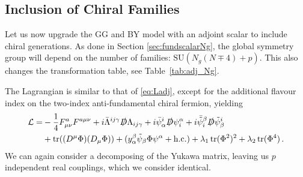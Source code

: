 \subsection{Inclusion of Chiral Families}\label{sec:adjNg}
 Let us now upgrade the GG and BY model with an adjoint scalar to include chiral generations. As done in Section \ref{sec:fundscalarNg}, the global symmetry group will depend on the number of families: $\mathrm{SU}(N_g(N\mp4)+p)$. This also changes the transformation table, see Table~\ref{tab:adj_Ng}. 

The Lagrangian is similar to that of \eqref{eq:Ladj}, except for the additional flavour index on the two-index anti-fundamental chiral fermion, yielding
\begin{align}
   \mathcal{L}= &-\frac{1}{4} F_{\mu\nu}^a F^{a\mu\nu}+ i \bar{\Lambda}^{ij\gamma} \slashed{D} \Lambda_{ij\gamma } 
    + i \bar{\psi}^i_\alpha \slashed{D} \psi_i^\alpha 
    + i \bar{\tilde{\psi}}_i^\beta \slashed{D} \tilde{\psi}^i_\beta\nonumber\\&+\operatorname{tr}((D^\mu\Phi)(D_\mu\Phi))+ (y^\beta_\alpha \tilde\psi_\beta \Phi\psi^{\alpha}+\mathrm{h.c.})+\lambda_1\operatorname{tr}(\Phi^2)^2+\lambda_2\operatorname{tr}(\Phi^4)
    \,.
\end{align}
We can again consider a decomposing of the Yukawa matrix, leaving us $p$ independent real couplings, which we consider identical. 
